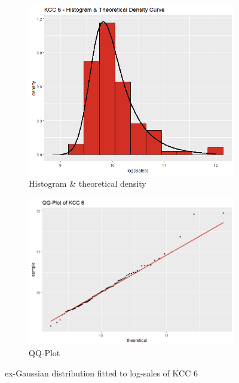  \begin{figure}[H]
\centering
\begin{subfigure}{.45\textwidth}
  \centering
  \includegraphics[width=\linewidth]{figures/kcc_6_density.png}
  \caption{Histogram \& theoretical density}
  \label{fig:kcc_6_density}
\end{subfigure}
\begin{subfigure}{.45\textwidth}
  \centering
  \includegraphics[width=\linewidth]{figures/kcc_6_qqplot.png}
  \caption{QQ-Plot}
  \label{fig:kcc_6_qqplot}
\end{subfigure}
\caption{ex-Gaussian distribution fitted to log-sales of \ac{KCC} 6}
\label{fig:kcc_6_marginal}
\end{figure} 


